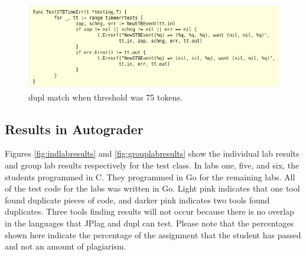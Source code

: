 \documentclass[10pt,journal,compsoc]{IEEEtran}
\begin{document}
		\begin{figure}[h!]
			\includegraphics[width=1.0\textwidth]{dupl75.png}
			\caption{dupl match when threshold was 75 tokens.}
			\label{fig:dupl75}
		\end{figure}
		
		\subsection{Results in Autograder}
		
		Figures \ref{fig:indlabresults} and \ref{fig:grouplabresults} show the individual lab results and group lab results respectively for the test class. In labs one, five, and six, the students programmed in C. They programmed in Go for the remaining labs. All of the test code for the labs was written in Go.  Light pink indicates that one tool found duplicate pieces of code, and darker pink indicates two tools found duplicates. Three tools finding results will not occur because there is no overlap in the languages that JPlag and dupl can test. Please note that the percentages shown here indicate the percentage of the assignment that the student has passed and not an amount of plagiarism.
		
\end{document}
